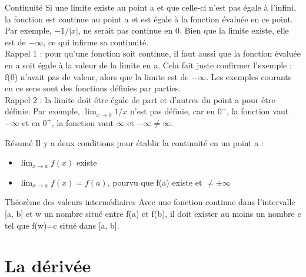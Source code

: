 \documentclass[10pt, french]{article}
\begin{document}
\begin{multicols*}{2}
\begin{rappel}{Continuité}
  Si une limite existe au point a et que celle-ci n'est pas égale à l'infini, la fonction est continue au point a et est égale à la fonction évaluée en ce point. Par exemple, $-1/\lvert{x}\rvert$, ne serait pas continue en 0. Bien que la limite existe, elle est de $-\infty$, ce qui infirme sa continuité.\\
  Rappel 1 : pour qu'une fonction soit continue, il faut aussi que la fonction évaluée en a soit égale à la valeur de la limite en a. Cela fait juste confirmer l'exemple : f(0) n'avait pas de valeur, alors que la limite est de $-\infty$. Les exemples courants en ce sens sont des fonctions définies par parties.\\
  Rappel 2 : la limite doit être égale de part et d'autres du point a pour être définie. Par exemple, $\lim_{x \to 0} 1/x$ n'est pas définie, car en $0^{-}$, la fonction vaut $-\infty$ et en $0^{+}$, la fonction vaut $\infty$ et $-\infty \ne \infty$.
  \begin{rappel}{Résumé}
  Il y a deux conditions pour établir la continuité en un point a :
  \begin{itemize}
    \item $\lim_{x \to a} f(x)$ existe
    \item $\lim_{x \to a} f(x) = f(a)$, pourvu que f(a) existe et $\ne \pm \infty$
   \end{itemize}
  \end{rappel}
\end{rappel}

\begin{rappel}{Théorème des valeurs intermédiaires}
  Avec une fonction continue dans l'intervalle [a, b] et w un nombre situé entre f(a) et f(b), il doit exister au moins un nombre c tel que f(w)=c situé dans [a, b]. 
\end{rappel}

\section{La dérivée}


\end{multicols*}
\end{document}
